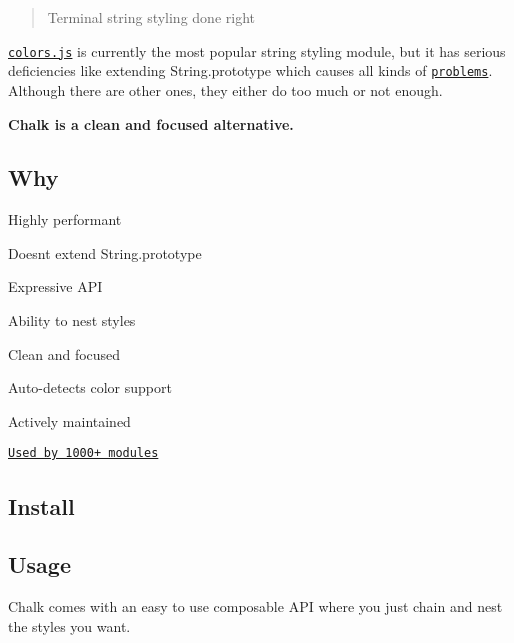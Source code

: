 \begin{quote}
Terminal string styling done right \end{quote}


\href{https://travis-ci.org/sindresorhus/chalk}{\tt } 

\href{https://github.com/Marak/colors.js}{\tt colors.\+js} is currently the most popular string styling module, but it has serious deficiencies like extending String.\+prototype which causes all kinds of \href{https://github.com/yeoman/yo/issues/68}{\tt problems}. Although there are other ones, they either do too much or not enough.

{\bfseries Chalk is a clean and focused alternative.}



\subsection*{Why}


\begin{DoxyItemize}
\item Highly performant
\item Doesn\textquotesingle{}t extend String.\+prototype
\item Expressive A\+PI
\item Ability to nest styles
\item Clean and focused
\item Auto-\/detects color support
\item Actively maintained
\item \href{https://npmjs.org/browse/depended/chalk}{\tt Used by 1000+ modules}
\end{DoxyItemize}

\subsection*{Install}




\subsection*{Usage}

Chalk comes with an easy to use composable A\+PI where you just chain and nest the styles you want.


